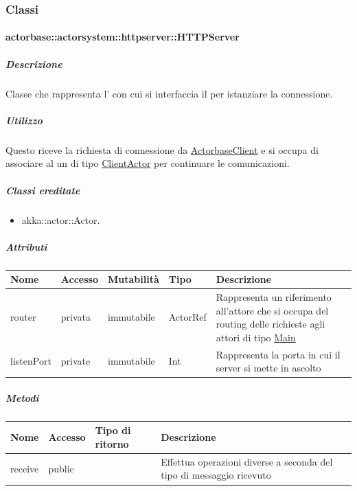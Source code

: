 \documentclass{scalatekids-article}
\begin{document}
\subsubsection{Classi}

\paragraph{actorbase::actorsystem::httpserver::HTTPServer}
\label{sec:actorbase::actorsystem::httpserver::HTTPServer}

\subparagraph{Descrizione}
Classe che rappresenta l' con cui si interfaccia il  per
istanziare la connessione.

\subparagraph{Utilizzo}

Questo  riceve la richiesta di connessione da
\hyperref[sec:actorbase::driver::client::ActorbaseClient]{ActorbaseClient}
e si occupa di associare al  un  di tipo
\hyperref[sec:actorbase::actorsystem::clientactor::ClientActor]{ClientActor}
per continuare le comunicazioni.

\subparagraph{Classi ereditate}
\begin{itemize}
  \item akka::actor::Actor.
\end{itemize}

\subparagraph{Attributi}
\begin{tabular}{| p{3cm} | p{1.5cm} | p{2cm} | p{2cm} | p{8.5cm} |}
  \hline
  Nome & Accesso & Mutabilità & Tipo & Descrizione\\
  \hline
  router & privata & immutabile & ActorRef & Rappresenta un riferimento all'attore che si occupa del routing delle richieste agli attori di tipo \hyperref[sec:actorbase::actorsystem::main::Main]{Main} \\
  \hline
  listenPort & private & immutabile & Int & Rappresenta la porta in cui il server si mette in ascolto \\
  \hline
\end{tabular}

\subparagraph{Metodi}

\begin{tabular}{| l | l | l | l |}
  \hline
  Nome & Accesso & Tipo di ritorno & Descrizione\\
  \hline
  receive & public &  & Effettua operazioni diverse a seconda del tipo di messaggio ricevuto\\
  \hline
\end{tabular}
\end{document}
